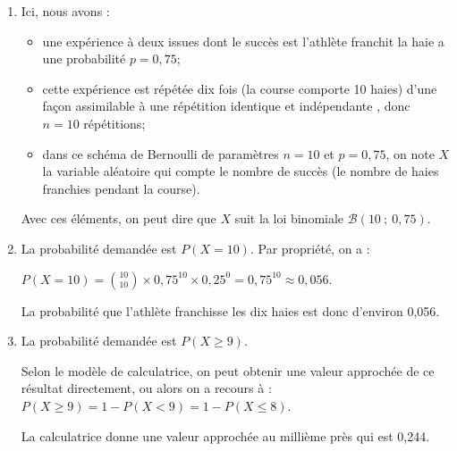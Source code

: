 \documentclass[10pt]{article}
\begin{document}
\begin{enumerate}
\item Ici, nous avons :
\begin{itemize}
\item une expérience à deux issues  dont le succès est \og l'athlète  franchit la haie \fg{} a une probabilité $p = 0,75$;
\item cette expérience est répétée dix fois (la course comporte 10 haies) d'une façon assimilable à une répétition identique et indépendante , donc $n=10$ répétitions;
\item dans ce schéma de Bernoulli de paramètres $n=10$ et $p=0,75$, on note $X$ la variable aléatoire qui compte le nombre de succès (le nombre de haies franchies pendant la course).
\end{itemize}
Avec ces éléments, on peut dire que $X$ suit la loi binomiale $ \mathcal{B}\left(10 ~;~ 0,75\right) $.
\item La probabilité demandée est $P(X = 10)$. Par propriété, on a :

$\displaystyle P(X=10) = \binom{10}{10} \times 0,75^{10} \times 0,25^0 = 0,75^{10}\approx 0,056$.

La probabilité que l'athlète franchisse les dix haies est donc d'environ  0,056.

\item  La probabilité demandée est $P(X \geqslant 9)$.

Selon le modèle de calculatrice, on peut obtenir une valeur approchée de ce résultat directement, ou alors on a recours à : $P(X \geqslant 9) = 1 - P(X <9) = 1 - P(X \leqslant 8)$.

La calculatrice donne une valeur approchée au millième près qui est 0,244.
\end{enumerate}

\bigskip
\end{document}

